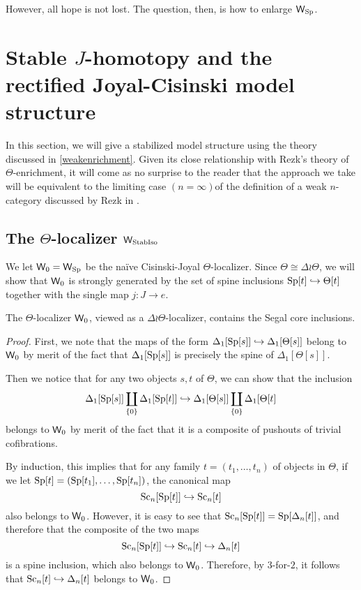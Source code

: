 However, all hope is not lost.  The question, then, is how to enlarge \(\mathsf{W}_{{\operatorname{Sp}}}\). 

\section{Stable $J$-homotopy and the rectified Joyal-Cisinski model structure}
In this section, we will give a stabilized model structure using the theory discussed in \eqref{weakenrichment}.  Given its close relationship with Rezk's theory of \(\Theta\)-enrichment, it will come as no surprise to the reader that the approach we take will be equivalent to the limiting case \((n=\infty)\)of the definition of a weak \(n\)-category discussed by Rezk in \cite{rezk-theta-n-spaces}. 

\subsection{The $\Theta$-localizer $\mathsf{W}_{\operatorname{StabIso}}$}
We let \(\mathsf{W}_0=\mathsf{W}_{\operatorname{Sp}}\) be the na\"ive Cisinski-Joyal \(\Theta\)-localizer.  Since \(\Theta \cong \Delta\wr\Theta\), we will show that \(\mathsf{W}_0\) is strongly generated by the set of spine inclusions \({\operatorname{Sp}}[t]\hookrightarrow \Theta[t]\) together with the single map \(j:J\to e\).  
\begin{lemma}\label{spinescontaincores} 
The \(\Theta\)-localizer \(\mathsf{W}_0\), viewed as a \(\Delta\wr \Theta\)-localizer, contains the Segal core inclusions. 
\end{lemma} 
\begin{proof}
First, we note that the maps of the form \(\Delta_1[{\operatorname{Sp}}[s]]\hookrightarrow \Delta_1[\Theta[s]]\) belong to \(\mathsf{W}_0\) by merit of the fact that \(\Delta_1[{\operatorname{Sp}}[s]]\) is precisely the spine of \(\Delta_1[\Theta[s]]\).

Then we notice that for any two objects \(s,t\) of \(\Theta\), we can show that the inclusion \[\Delta_1[{\operatorname{Sp}}[s]]\coprod_{\{0\}} \Delta_1[{\operatorname{Sp}}[t]]\hookrightarrow \Delta_1[\Theta[s]]\coprod_{\{0\}} \Delta_1[\Theta[t]\] belongs to \(\mathsf{W}_0\) by merit of the fact that it is a composite of pushouts of trivial cofibrations.  

By induction, this implies that for any family \(t=(t_1,\dots,t_n)\) of objects in \(\Theta\), if we let \({\operatorname{Sp}}[t]=({\operatorname{Sp}}[t_1],\dots,{\operatorname{Sp}}[t_n])\), the canonical map \[{\operatorname{Sc}}_n[{\operatorname{Sp}}[t]]\hookrightarrow {\operatorname{Sc}}_n[t]\] also belongs to \(\mathsf{W}_0\).  However, it is easy to see that \({\operatorname{Sc}}_n[{\operatorname{Sp}}[t]]={\operatorname{Sp}}[\Delta_n[t]]\), and therefore that the composite of the two maps  \[{\operatorname{Sc}}_n[{\operatorname{Sp}}[t]]\hookrightarrow {\operatorname{Sc}}_n[t]\hookrightarrow \Delta_n[t]\] is a spine inclusion, which also belongs to \(\mathsf{W}_0\).  Therefore, by \(3\)-for-\(2\), it follows that \({\operatorname{Sc}}_n[t]\hookrightarrow \Delta_n[t]\) belongs to \(\mathsf{W}_0\).  
\end{proof}
